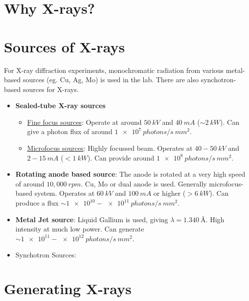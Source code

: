 \documentclass[11pt,a4paper]{article}
\newcommand{\bfnt}[1]{{\bfseries #1}}
\begin{document}
	\section{Why X-rays?}
	
		
	
	\section{Sources of X-rays}
	
		For X-ray diffraction experiments, monochromatic radiation from various metal-based sources (eg. Cu, Ag, Mo) is used in the lab. There are also synchotron-based sources for X-rays.%
%			
			\begin{itemize}%
%			
			    \item \bfnt{Sealed-tube X-ray sources}%
%			    	
			    	\begin{itemize}[label={$\hookrightarrow$}]%
%			    	
			    	    \item \ul{Fine focus sources}: Operate at around $50~\si{kV}$ and $40~\si{mA}$ ($\sim \SI{2}{kW}$). Can give a photon flux of around $\SI{1e7}{photons/s~mm^2}.$
			    	    
			    	    \item \ul{Microfocus sources}: Highly focussed beam. Operates at $40-50~\si{kV}$ and $2-15~\si{mA}$  ($<\SI{1}{kW}$). Can provide around $\SI{1e8}{photons/s~mm^2}.$
			    	    
			    	\end{itemize}
			    	
			    \item \bfnt{Rotating anode based source}: The anode is rotated at a very high speed of around $10,000~\si{rpm}.$ Cu, Mo or dual anode is used. Generally microfocus-based system. Operates at $\SI{60}{kV}$ and $\SI{100}{mA}$ or higher ($> \SI{6}{kW}$). Can produce a flux $\sim \num{1e10}-\num{e11}~\si{photons/s~mm^2}.$
			    
			    \item \bfnt{Metal Jet source}: Liquid Gallium is used, giving $\lambda = \SI{1.340}{\angstrom}.$ High intensity at much low power. Can generate $\sim \num{1e11}-\num{e12}~\si{photons/s~mm^2}.$
			    
			    \item Synchotron Sources:
			    
			\end{itemize}
	
	\section{Generating X-rays}
	
\end{document}

